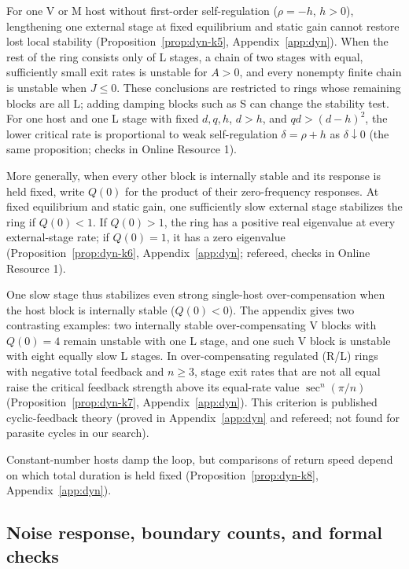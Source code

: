 For one V or M host without first-order self-regulation ($\rho=-h$, $h>0$), lengthening one external stage at fixed equilibrium and static gain cannot restore lost local stability (Proposition~\ref{prop:dyn-k5}, Appendix~\ref{app:dyn}). When the rest of the ring consists only of L stages, a chain of two stages with equal, sufficiently small exit rates is unstable for $A>0$, and every nonempty finite chain is unstable when $J\leq0$. These conclusions are restricted to rings whose remaining blocks are all L; adding damping blocks such as S can change the stability test. For one host and one L stage with fixed $d,q,h$, $d>h$, and $qd>(d-h)^2$, the lower critical rate is proportional to weak self-regulation $\delta=\rho+h$ as $\delta\downarrow0$ (the same proposition; checks in Online Resource 1).

More generally, when every other block is internally stable and its response is held fixed, write $Q(0)$ for the product of their zero-frequency responses. At fixed equilibrium and static gain, one sufficiently slow external stage stabilizes the ring if $Q(0)<1$. If $Q(0)>1$, the ring has a positive real eigenvalue at every external-stage rate; if $Q(0)=1$, it has a zero eigenvalue (Proposition~\ref{prop:dyn-k6}, Appendix~\ref{app:dyn}; refereed, checks in Online Resource 1).

One slow stage thus stabilizes even strong single-host over-compensation when the host block is internally stable ($Q(0)<0$). The appendix gives two contrasting examples: two internally stable over-compensating V blocks with $Q(0)=4$ remain unstable with one L stage, and one such V block is unstable with eight equally slow L stages. In over-compensating regulated (R/L) rings with negative total feedback and $n\geq3$, stage exit rates that are not all equal raise the critical feedback strength above its equal-rate value $\sec^n(\pi/n)$ (Proposition~\ref{prop:dyn-k7}, Appendix~\ref{app:dyn}). This criterion is published cyclic-feedback theory \citep{sontag2006,arcak2006,arcak2008,nguyen2009,hori2011,ananthasubramaniam2014} (proved in Appendix~\ref{app:dyn} and refereed; not found for parasite cycles in our search).

Constant-number hosts damp the loop, but comparisons of return speed depend on which total duration is held fixed (Proposition~\ref{prop:dyn-k8}, Appendix~\ref{app:dyn}).

\subsection{Noise response, boundary counts, and formal checks}\label{subsec:dyn-noise}

